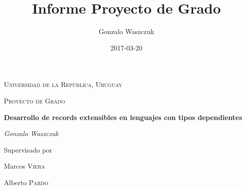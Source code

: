 \documentclass[a4paper,oneside,openany,spanish]{book}
\title{Informe Proyecto de Grado}
\author{Gonzalo Waszczuk}
\begin{document}
\frontmatter

\begin{titlepage}
	\centering
	{\scshape\LARGE Universidad de la República, Uruguay \par}
	\vspace{1cm}
	{\scshape\Large Proyecto de Grado\par}
	\vspace{1.5cm}
	{\huge\bfseries Desarrollo de records extensibles en lenguajes con tipos dependientes\par}
	\vspace{2cm}
	{\Large\itshape Gonzalo Waszczuk\par}
	\vfill
	Supervisado por\par
	Marcos \textsc{Viera}\par
        Alberto \textsc{Pardo}
	\vfill

	{\large \date{2017-03-20}\par}
\end{titlepage}



\tableofcontents


\mainmatter

\cleardoublepage

















\backmatter


\printbibliography

\end{document}
